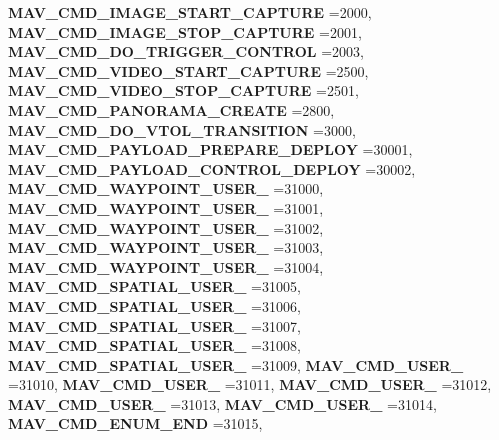 \begin{DoxyCompactItemize}
\textbf{ M\+A\+V\+\_\+\+C\+M\+D\+\_\+\+I\+M\+A\+G\+E\+\_\+\+S\+T\+A\+R\+T\+\_\+\+C\+A\+P\+T\+U\+RE} =2000, 
\textbf{ M\+A\+V\+\_\+\+C\+M\+D\+\_\+\+I\+M\+A\+G\+E\+\_\+\+S\+T\+O\+P\+\_\+\+C\+A\+P\+T\+U\+RE} =2001, 
\textbf{ M\+A\+V\+\_\+\+C\+M\+D\+\_\+\+D\+O\+\_\+\+T\+R\+I\+G\+G\+E\+R\+\_\+\+C\+O\+N\+T\+R\+OL} =2003, 
\newline
\textbf{ M\+A\+V\+\_\+\+C\+M\+D\+\_\+\+V\+I\+D\+E\+O\+\_\+\+S\+T\+A\+R\+T\+\_\+\+C\+A\+P\+T\+U\+RE} =2500, 
\textbf{ M\+A\+V\+\_\+\+C\+M\+D\+\_\+\+V\+I\+D\+E\+O\+\_\+\+S\+T\+O\+P\+\_\+\+C\+A\+P\+T\+U\+RE} =2501, 
\textbf{ M\+A\+V\+\_\+\+C\+M\+D\+\_\+\+P\+A\+N\+O\+R\+A\+M\+A\+\_\+\+C\+R\+E\+A\+TE} =2800, 
\textbf{ M\+A\+V\+\_\+\+C\+M\+D\+\_\+\+D\+O\+\_\+\+V\+T\+O\+L\+\_\+\+T\+R\+A\+N\+S\+I\+T\+I\+ON} =3000, 
\newline
\textbf{ M\+A\+V\+\_\+\+C\+M\+D\+\_\+\+P\+A\+Y\+L\+O\+A\+D\+\_\+\+P\+R\+E\+P\+A\+R\+E\+\_\+\+D\+E\+P\+L\+OY} =30001, 
\textbf{ M\+A\+V\+\_\+\+C\+M\+D\+\_\+\+P\+A\+Y\+L\+O\+A\+D\+\_\+\+C\+O\+N\+T\+R\+O\+L\+\_\+\+D\+E\+P\+L\+OY} =30002, 
\textbf{ M\+A\+V\+\_\+\+C\+M\+D\+\_\+\+W\+A\+Y\+P\+O\+I\+N\+T\+\_\+\+U\+S\+E\+R\+\_} =31000, 
\textbf{ M\+A\+V\+\_\+\+C\+M\+D\+\_\+\+W\+A\+Y\+P\+O\+I\+N\+T\+\_\+\+U\+S\+E\+R\+\_} =31001, 
\newline
\textbf{ M\+A\+V\+\_\+\+C\+M\+D\+\_\+\+W\+A\+Y\+P\+O\+I\+N\+T\+\_\+\+U\+S\+E\+R\+\_} =31002, 
\textbf{ M\+A\+V\+\_\+\+C\+M\+D\+\_\+\+W\+A\+Y\+P\+O\+I\+N\+T\+\_\+\+U\+S\+E\+R\+\_} =31003, 
\textbf{ M\+A\+V\+\_\+\+C\+M\+D\+\_\+\+W\+A\+Y\+P\+O\+I\+N\+T\+\_\+\+U\+S\+E\+R\+\_} =31004, 
\textbf{ M\+A\+V\+\_\+\+C\+M\+D\+\_\+\+S\+P\+A\+T\+I\+A\+L\+\_\+\+U\+S\+E\+R\+\_} =31005, 
\newline
\textbf{ M\+A\+V\+\_\+\+C\+M\+D\+\_\+\+S\+P\+A\+T\+I\+A\+L\+\_\+\+U\+S\+E\+R\+\_} =31006, 
\textbf{ M\+A\+V\+\_\+\+C\+M\+D\+\_\+\+S\+P\+A\+T\+I\+A\+L\+\_\+\+U\+S\+E\+R\+\_} =31007, 
\textbf{ M\+A\+V\+\_\+\+C\+M\+D\+\_\+\+S\+P\+A\+T\+I\+A\+L\+\_\+\+U\+S\+E\+R\+\_} =31008, 
\textbf{ M\+A\+V\+\_\+\+C\+M\+D\+\_\+\+S\+P\+A\+T\+I\+A\+L\+\_\+\+U\+S\+E\+R\+\_} =31009, 
\newline
\textbf{ M\+A\+V\+\_\+\+C\+M\+D\+\_\+\+U\+S\+E\+R\+\_} =31010, 
\textbf{ M\+A\+V\+\_\+\+C\+M\+D\+\_\+\+U\+S\+E\+R\+\_} =31011, 
\textbf{ M\+A\+V\+\_\+\+C\+M\+D\+\_\+\+U\+S\+E\+R\+\_} =31012, 
\textbf{ M\+A\+V\+\_\+\+C\+M\+D\+\_\+\+U\+S\+E\+R\+\_} =31013, 
\newline
\textbf{ M\+A\+V\+\_\+\+C\+M\+D\+\_\+\+U\+S\+E\+R\+\_} =31014, 
\textbf{ M\+A\+V\+\_\+\+C\+M\+D\+\_\+\+E\+N\+U\+M\+\_\+\+E\+ND} =31015, 

\end{DoxyCompactItemize}
